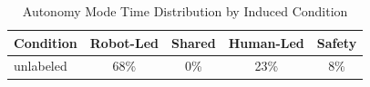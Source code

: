 \begin{table}[t]
\caption{Autonomy Mode Time Distribution by Induced Condition}
\label{tab:xvi}
\centering
\begin{tabular}{lcccc}
\toprule
Condition & Robot-Led & Shared & Human-Led & Safety \\
\midrule
unlabeled & 68\% & 0\% & 23\% & 8\% \\
\bottomrule
\end{tabular}
\end{table}
